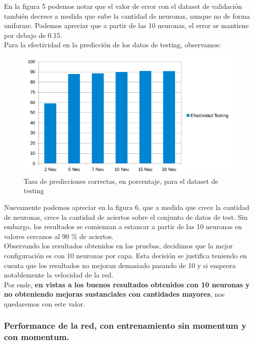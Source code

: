 En la figura 5 podemos notar que el valor de error con el dataset de validación también decrece a medida que sube la cantidad
de neuronas, aunque no de forma uniforme. Podemos apreciar que a partir de las 10 neuronas, el error se mantiene por debajo de 0.15.\\

Para la efectividad en la predicción de los datos de testing, observamos:\\

\begin{figure}[h]
  \begin{center}
  \includegraphics[scale=0.75]{graficos/fig6_cant_neuro_testing.png}
  \caption{Tasa de predicciones correctas, en porcentaje, para el dataset de testing}
  \end{center}
\end{figure}

Nuevamente podemos apreciar en la figura 6, que a medida que crece la cantidad de neuronas, crece la cantidad de aciertos sobre el conjunto de datos de test. Sin embargo, los resultados se comienzan a estancar a partir de las 10 neuronas en valores cercanos al 90 \% de aciertos.\\

Observando los resultados obtenidos en las pruebas, decidimos que la mejor configuración es con 10 neuronas por capa. Esta decisión se justifica teniendo en cuenta que los resultados no mejoran demasiado pasando de 10 y si empeora notablemente la velocidad de la red.\\
Por ende, \textbf{en vistas a los buenos resultados obtenidos con 10 neuronas y no obteniendo mejoras sustanciales con cantidades mayores}, nos quedaremos con este valor.

\subsubsection{Performance de la red, con entrenamiento sin momentum y con momentum.}

